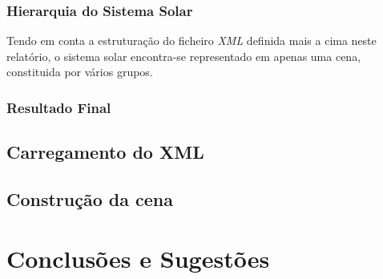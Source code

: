 \documentclass[a4paper]{article}
\begin{document}
\subsubsection{Hierarquia do Sistema Solar}

\hspace{3mm} Tendo em conta a estruturação do ficheiro \emph{XML} definida mais a cima neste relatório, o sistema solar encontra-se representado em apenas uma cena, constituida por vários grupos.

\par 


\subsubsection{Resultado Final}



\subsection{Carregamento do XML} %




\subsection{Construção da cena} %


\newpage
\section{Conclusões e Sugestões}



\newpage


\end{document}
